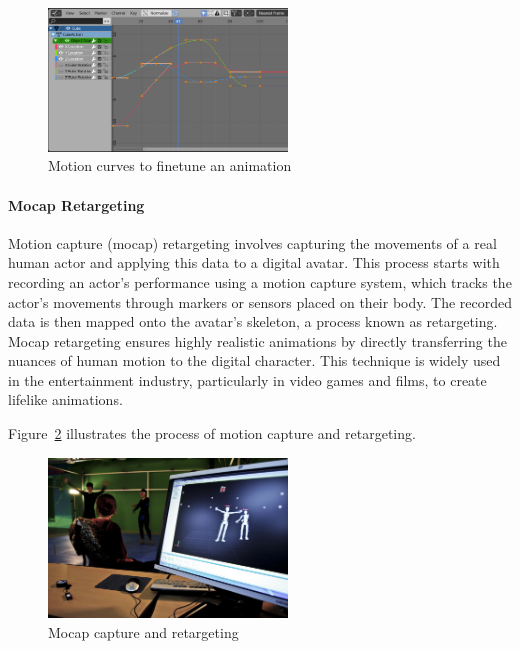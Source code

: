 \documentclass[../../main.tex]{subfiles}
\begin{document}
\begin{figure} 
  \centering \includegraphics[width = 2.5in]{chapters/background_work/images/motion_curves.png} 
  \caption{Motion curves to finetune an animation} 
  \label{fig:motion_curves} 
\end{figure}

\paragraph{Mocap Retargeting}
\label{ch:background_work:sign_language_synthesis:3d_techniques:avatar_animation:mocap_retargeting}

Motion capture (mocap) retargeting involves capturing the movements of a real human actor and applying this data to a digital avatar. This process starts with recording an actor’s performance using a motion capture system, which tracks the actor’s movements through markers or sensors placed on their body. The recorded data is then mapped onto the avatar’s skeleton, a process known as retargeting. Mocap retargeting ensures highly realistic animations by directly transferring the nuances of human motion to the digital character. This technique is widely used in the entertainment industry, particularly in video games and films, to create lifelike animations.

Figure~\ref{fig:mocap} illustrates the process of motion capture and retargeting.

\begin{figure} 
  \centering \includegraphics[width = 2.5in]{chapters/background_work/images/mocap.png} 
  \caption{Mocap capture and retargeting} 
  \label{fig:mocap} 
\end{figure}
\end{document}
